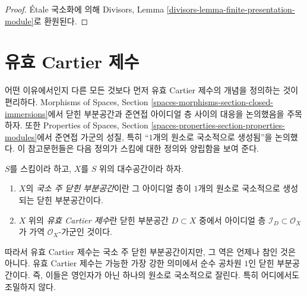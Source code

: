 \begin{proof}
\'Etale 국소화에 의해 Divisors, Lemma
\ref{divisors-lemma-finite-presentation-module}로 환원된다.
\end{proof}














\section{유효 Cartier 제수}
\label{section-effective-Cartier-divisors}

\noindent
어떤 이유에서인지 다른 모든 것보다 먼저 유효 Cartier 제수의 개념을
정의하는 것이 편리하다. Morphisms of Spaces, Section
\ref{spaces-morphisms-section-closed-immersions}에서 닫힌 부분공간과 준연접
아이디얼 층 사이의 대응을 논의했음을 주목하자. 또한 Properties of Spaces,
Section \ref{spaces-properties-section-properties-modules}에서 준연접 가군의
성질, 특히 ``$1$개의 원소로 국소적으로 생성됨''을 논의했다. 이 참고문헌들은
다음 정의가 스킴에 대한 정의와 양립함을 보여 준다.

\begin{definition}
\label{definition-effective-Cartier-divisor}
$S$를 스킴이라 하고, $X$를 $S$ 위의 대수공간이라 하자.
\begin{enumerate}
\item $X$의 {\it 국소 주 닫힌 부분공간}이란 그 아이디얼 층이 $1$개의
원소로 국소적으로 생성되는 닫힌 부분공간이다.
\item $X$ 위의 {\it 유효 Cartier 제수}란 닫힌 부분공간 $D \subset X$ 중에서
아이디얼 층 $\mathcal{I}_D \subset \mathcal{O}_X$가 가역
$\mathcal{O}_X$-가군인 것이다.
\end{enumerate}
\end{definition}

\noindent
따라서 유효 Cartier 제수는 국소 주 닫힌 부분공간이지만, 그 역은 언제나
참인 것은 아니다. 유효 Cartier 제수는 가능한 가장 강한 의미에서 순수
공차원 $1$인 닫힌 부분공간이다. 즉, 이들은 영인자가 아닌 하나의 원소로
국소적으로 잘린다. 특히 어디에서도 조밀하지 않다.

